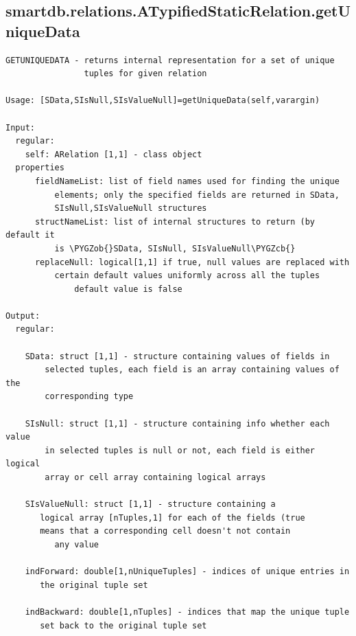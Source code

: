 \documentclass[letterpaper,10pt,english]{sphinxmanual}
\def\PYGZob{\char`\{}
\def\PYGZcb{\char`\}}
\begin{document}
\subsection{smartdb.relations.ATypifiedStaticRelation.getUniqueData}
\label{chap_functions:smartdb-relations-atypifiedstaticrelation-getuniquedata}
\begin{Verbatim}[commandchars=\\\{\}]
GETUNIQUEDATA - returns internal representation for a set of unique
                tuples for given relation

Usage: [SData,SIsNull,SIsValueNull]=getUniqueData(self,varargin)

Input:
  regular:
    self: ARelation [1,1] - class object
  properties
      fieldNameList: list of field names used for finding the unique
          elements; only the specified fields are returned in SData,
          SIsNull,SIsValueNull structures
      structNameList: list of internal structures to return (by default it
          is \PYGZob{}SData, SIsNull, SIsValueNull\PYGZcb{}
      replaceNull: logical[1,1] if true, null values are replaced with
          certain default values uniformly across all the tuples
              default value is false

Output:
  regular:

    SData: struct [1,1] - structure containing values of fields in
        selected tuples, each field is an array containing values of the
        corresponding type

    SIsNull: struct [1,1] - structure containing info whether each value
        in selected tuples is null or not, each field is either logical
        array or cell array containing logical arrays

    SIsValueNull: struct [1,1] - structure containing a
       logical array [nTuples,1] for each of the fields (true
       means that a corresponding cell doesn't not contain
          any value

    indForward: double[1,nUniqueTuples] - indices of unique entries in
       the original tuple set

    indBackward: double[1,nTuples] - indices that map the unique tuple
       set back to the original tuple set
\end{Verbatim}
\end{document}

